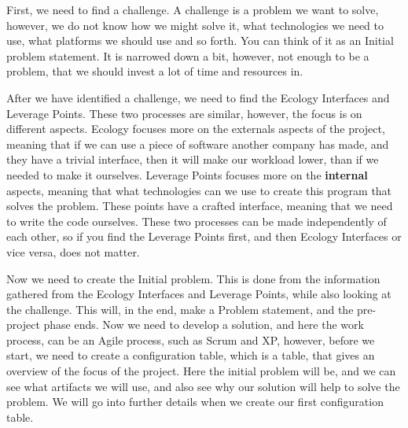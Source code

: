 First, we need to find a challenge.
A challenge is a problem we want to solve, however, we do not know how we might solve it, what technologies we need to use, what platforms we should use and so forth.
You can think of it as an Initial problem statement.
It is narrowed down a bit, however, not enough to be a problem, that we should invest a lot of time and resources in.

After we have identified a challenge, we need to find the Ecology Interfaces and Leverage Points.
These two processes are similar, however, the focus is on different aspects.
Ecology focuses more on the externals aspects of the project, meaning that if we can use a piece of software another company has made, and they have a trivial interface, then it will make our workload lower, than if we needed to make it ourselves.
Leverage Points focuses more on the \textbf{internal} aspects, meaning that what technologies can we use to create this program that solves the problem.
These points have a crafted interface, meaning that we need to write the code ourselves.
These two processes can be made independently of each other, so if you find the Leverage Points first, and then Ecology Interfaces or vice versa, does not matter.

Now we need to create the Initial problem. 
This is done from the information gathered from the Ecology Interfaces and Leverage Points, while also looking at the challenge.
This will, in the end, make a Problem statement, and the pre-project phase ends.
Now we need to develop a solution, and here the work process, can be an Agile process, such as Scrum and XP, however, before we start, we need to create a configuration table, which is a table, that gives an overview of the focus of the project. Here the initial problem will be, and we can see what artifacts we will use, and also see why our solution will help to solve the problem.
We will go into further details when we create our first configuration table.
